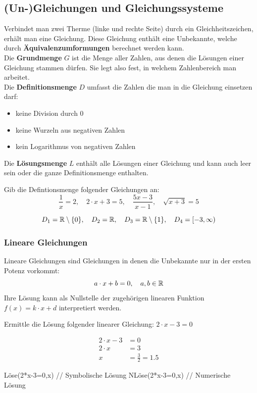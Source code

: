 \subsection{(Un-)Gleichungen und Gleichungssysteme}
Verbindet man zwei Therme (linke und rechte Seite) durch ein Gleichheitszeichen, erhält man eine Gleichung. Diese Gleichung enthält eine Unbekannte, welche durch \textbf{Äquivalenzumformungen} berechnet werden kann. \\
Die \textbf{Grundmenge} \(G\) ist die Menge aller Zahlen, aus denen die Lösungen einer Gleichung stammen dürfen. Sie legt also fest, in welchem Zahlenbereich man arbeitet. \\
Die \textbf{Definitionsmenge} \(D\) umfasst die Zahlen die man in die Gleichung einsetzen darf:
\begin{itemize}
    \item keine Division durch 0
    \item keine Wurzeln aus negativen Zahlen
    \item kein Logarithmus von negativen Zahlen
\end{itemize}
Die \textbf{Lösungsmenge} \(L\) enthält alle Lösungen einer Gleichung und kann auch leer sein oder die ganze Definitionsmenge enthalten.
\begin{aufgabe}
    Gib die Defintionsmenge folgender Gleichungen an: \\
    \[
        \frac{1}{x}=2,\quad 2\cdot x+3=5,\quad \frac{5x-3}{x-1},\quad \sqrt{x+3}=5
    \]
\end{aufgabe}
\begin{loesung}
    \[
        D_1=\mathbb{R} \setminus \{0\}, \quad
        D_2=\mathbb{R}, \quad
        D_3=\mathbb{R} \setminus \{1\}, \quad
        D_4=[-3,\infty)
    \]
\end{loesung}
\subsubsection{Lineare Gleichungen}
Lineare Gleichungen sind Gleichungen in denen die Unbekannte nur in der ersten Potenz vorkommt:
\begin{equation}
    a \cdot x + b = 0,\quad a,b \in \mathbb{R}
\end{equation}
Ihre Lösung kann als Nullstelle der zugehörigen linearen Funktion \(f(x)=k\cdot x + d\) interpretiert werden.
\begin{aufgabe}
    Ermittle die Lösung folgender linearer Gleichung: \(2\cdot x - 3 = 0\)
\end{aufgabe}
\begin{loesung}
    \begin{align*}
        2\cdot x - 3 &= 0 \\
        2\cdot x &= 3 \\
        x &= \frac{3}{2} = 1.5
    \end{align*}
\end{loesung}
\begin{geogebracode}
Löse(2*x-3=0,x)   // Symbolische Lösung
NLöse(2*x-3=0,x)  // Numerische Lösung
\end{geogebracode}
